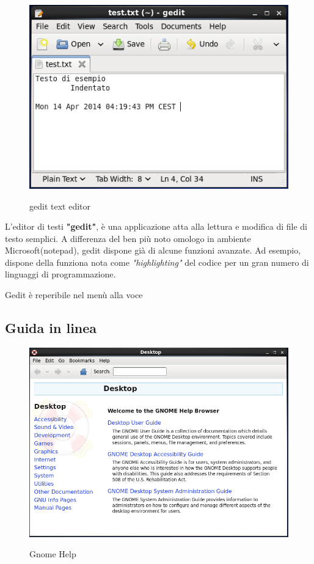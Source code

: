 \begin{figure}[!ht]
 \centering
 \includegraphics[scale=0.6]{Immagini/gedit1.png}
 \label{fig:gedit}
 \caption{gedit text editor}
\end{figure}


L'editor di testi \textbf{"gedit"}, è una applicazione atta alla lettura e modifica di file di testo semplici. A differenza del ben più noto omologo in ambiente Microsoft\textregistered (notepad), gedit dispone già di alcune funzioni avanzate. Ad esempio, dispone della funziona nota come \textit{"highlighting"} del codice per un gran numero di linguaggi di programmazione.

Gedit è reperibile nel menù alla voce 

\subsection{Guida in linea}

\begin{figure}[!ht]
  \centering
  \includegraphics[scale=0.54]{Immagini/gnome_help1.png}
  \label{fig:gnome_help}
  \caption{Gnome Help}
\end{figure}

